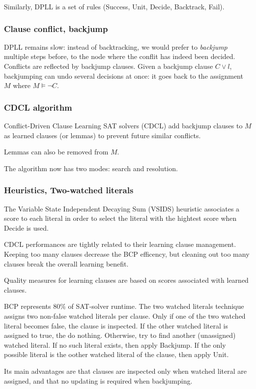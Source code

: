 \documentclass[toc]{../cs-classes/cs-classes}
\begin{document}
Similarly, DPLL is a set of rules (Success, Unit, Decide, Backtrack, Fail).

\subsubsection{Clause conflict, backjump}
DPLL remains slow: instead of backtracking, we would prefer to \emph{backjump} multiple steps before, to the node where the conflit has indeed been decided. Conflicts are reflected by backjump clauses. Given a backjump clause $C\lor l$, backjumping can undo several decisions at once: it goes back to the assignment $M$ where $M \vDash \lnot C$.

\subsubsection{CDCL algorithm}
Conflict-Driven Clause Learning SAT solvers (CDCL) add backjump clauses to $M$ as learned clauses (or lemmas) to prevent future similar conflicts. 

Lemmas can also be removed from $M$.

The algorithm now has two modes: search and resolution. 

\subsubsection{Heuristics, Two-watched literals}
The Variable State Independent Decaying Sum (VSIDS) heuristic associates a score to each literal in order to select the literal with the hightest score when Decide is used.

CDCL performances are tightly related to their learning clause management. Keeping too many clauses decrease the BCP efficency, but cleaning out too many clauses break the overall learning benefit.

Quality measures for learning clauses are based on scores associated with learned clauses. 

BCP represents 80\% of SAT-solver runtime. The two watched literals technique assigns two non-false watched literals per clause. Only if one of the two watched literal becomes false, the clause is inspected. If the other watched literal is assigned to true, the do nothing. Otherwise, try to find another (unassigned) watched literal. If no such literal exists, then apply Backjump. If the only possible literal is the oother watched literal of the clause, then apply Unit.

Its main advantages are that clauses are inspected only when watched literal are assigned, and that no updating is required when backjumping.
\end{document}
